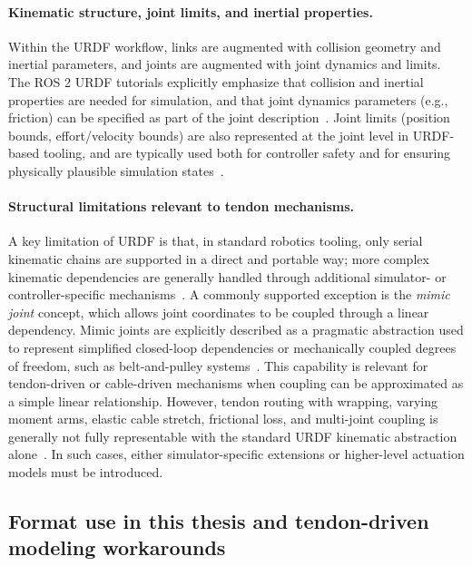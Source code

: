 \paragraph{Kinematic structure, joint limits, and inertial properties.}
Within the \ac{URDF} workflow, links are augmented with collision geometry and inertial parameters, and joints are augmented with joint dynamics and limits. The ROS 2 \ac{URDF} tutorials explicitly emphasize that collision and inertial properties are needed for simulation, and that joint dynamics parameters (e.g., friction) can be specified as part of the joint description~\cite{ros2_urdf_physical_properties}. Joint limits (position bounds, effort/velocity bounds) are also represented at the joint level in \ac{URDF}-based tooling, and are typically used both for controller safety and for ensuring physically plausible simulation states~\cite{ros2_urdf_physical_properties}.

\paragraph{Structural limitations relevant to tendon mechanisms.}
A key limitation of \ac{URDF} is that, in standard robotics tooling, only serial kinematic chains are supported in a direct and portable way; more complex kinematic dependencies are generally handled through additional simulator- or controller-specific mechanisms~\cite{ros2_control_joint_kinematics}. A commonly supported exception is the \emph{mimic joint} concept, which allows joint coordinates to be coupled through a linear dependency. Mimic joints are explicitly described as a pragmatic abstraction used to represent simplified closed-loop dependencies or mechanically coupled degrees of freedom, such as belt-and-pulley systems~\cite{ros2_control_joint_kinematics}. This capability is relevant for tendon-driven or cable-driven mechanisms when coupling can be approximated as a simple linear relationship. However, tendon routing with wrapping, varying moment arms, elastic cable stretch, frictional loss, and multi-joint coupling is generally not fully representable with the standard \ac{URDF} kinematic abstraction alone~\cite{ros2_control_joint_kinematics}. In such cases, either simulator-specific extensions or higher-level actuation models must be introduced.

\subsection{Format use in this thesis and tendon-driven modeling workarounds}
